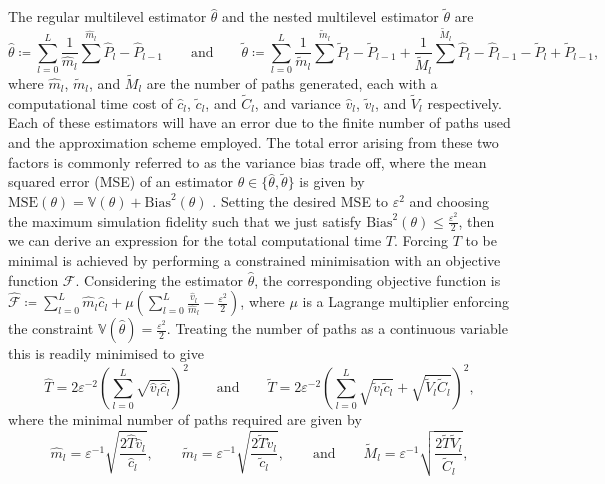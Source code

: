 \documentclass[manuscript,review]{acmart}
\begin{document}
The regular multilevel estimator $ \hat{\theta} $ and the nested multilevel estimator $ \tilde{\theta} $ are
\begin{equation*}
\hat{\theta}  \coloneqq \sum_{l=0}^{L} \dfrac{1}{\hat{m}_l} \sum^{\hat{m}_l} \hat{P}_l - \hat{P}_{l-1}
\qquad \text{and} \qquad
\tilde{\theta} \coloneqq \sum_{l=0}^L \dfrac{1}{\tilde{m}_l} \sum^{\tilde{m}_l} \tilde{P}_l - \tilde{P}_{l-1} + \dfrac{1}{\tilde{M}_l} \sum^{\tilde{M}_l} \hat{P}_l - \hat{P}_{l-1} - \tilde{P}_l + \tilde{P}_{l-1},
\end{equation*}
where $ \hat{m}_l $, $ \tilde{m}_l $, and $ \tilde{M}_l $ are the number of paths generated, each with a computational time cost of $ \hat{c}_l $, $ \tilde{c}_l $, and $ \tilde{C}_l $, and variance $ \hat{v}_l $, $ \tilde{v}_l $, and $ \tilde{V}_l $ respectively. Each of these estimators will have an error due to the finite number of paths used and the approximation scheme employed. The total error arising from these two factors is commonly referred to as the variance bias trade off, where the mean squared error (MSE) of an estimator $ \theta \in \{\hat{\theta}, \tilde{\theta}\} $ is given by $ \text{MSE}(\theta) = \mathbb{V}(\theta) + \text{Bias}^2(\theta)$ \citep[page~16]{glasserman2013monte}. Setting the desired MSE to $ \varepsilon^2 $ and choosing the maximum simulation fidelity such that we just satisfy $ \text{Bias}^2(\theta) \leq \tfrac{\varepsilon^2}{2} $, then we can derive an expression for the total computational time $ T $. Forcing $ T $ to be minimal is achieved by performing a constrained minimisation with an objective function $ \mathscr{F} $. Considering the estimator $ \hat{\theta} $, the corresponding objective function is $ \hat{\mathscr{F}} \coloneqq \sum_{l=0}^{L} \hat{m}_l \hat{c}_l + \mu (\sum_{l=0}^{L} \tfrac{\hat{v}_l}{\hat{m}_l} - \tfrac{\varepsilon^2}{2}) $, where $ \mu $ is a Lagrange multiplier enforcing the constraint $ \mathbb{V}(\hat{\theta}) = \tfrac{\varepsilon^2}{2} $. Treating the number of paths as a continuous variable this is readily minimised to give
\begin{equation*}
\hat{T} = 2\varepsilon^{-2}\left(\sum_{l=0}^L \sqrt{\hat{v}_l \hat{c}_l}\right)^2 
\qquad \text{and} \qquad 
\tilde{T} = 2\varepsilon^{-2} \left(\sum_{l=0}^L \sqrt{\tilde{v}_l \tilde{c}_l} + \sqrt{\tilde{V}_l \tilde{C}_l}\right)^2,
\end{equation*}
where the minimal number of paths required are given by
\begin{equation*}
\hat{m}_l = \varepsilon^{-1} \sqrt{\dfrac{2\hat{T}\hat{v}_l}{\hat{c}_l}},
\qquad 
\tilde{m}_l  = \varepsilon^{-1} \sqrt{\dfrac{2\tilde{T} \tilde{v}_l}{\tilde{c}_l}}, 
\qquad 
\text{and}
\qquad 
\tilde{M}_l  = \varepsilon^{-1} \sqrt{\dfrac{2\tilde{T} \tilde{V}_l}{\tilde{C}_l}},
\end{equation*}
\end{document}
